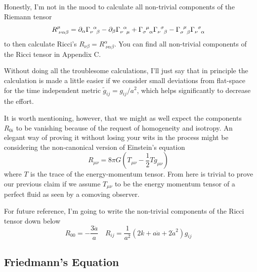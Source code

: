 Honestly, I'm not in the mood to calculate all non-trivial components of the Riemann tensor
\begin{equation}
    R^{\mu}_{\;\nu\alpha\beta} = \partial_{\alpha}\Gamma_{\nu\;\;\beta}^{\;\;\alpha} - \partial_{\beta}\Gamma_{\nu\;\;\mu}^{\;\;\alpha} + \Gamma_{\sigma\;\;\alpha}^{\;\;\mu}\Gamma_{\nu\;\;\beta}^{\;\;\sigma} - \Gamma_{\sigma\;\;\beta}^{\;\;\mu}\Gamma_{\nu\;\;\alpha}^{\;\;\sigma}
    \label{eq:riemann tensor}
\end{equation}
to then calculate Ricci's $R_{\nu\beta} =  R^{\alpha}_{\;\nu\alpha\beta}$. You can find all non-trivial components of the Ricci tensor in Appendix C.
\par Without doing all the troublesome calculations, I'll just say that in principle the calculation is made a little easier if we consider small deviations from flat-space for the time independent metric $\tilde{g}_{ij} = g_{ij}/a^{2}$, which helps significantly to decrease the effort.
\par It is worth mentioning, however, that we might as well expect the components $R_{0i}$ to be vanishing because of the request of homogeneity and isotropy. An elegant way of proving it without losing your wits in the process might be considering the non-canonical version of Einstein's equation
\begin{equation}
    R_{\mu\nu} = 8\pi G \left(T_{\mu\nu} -\frac{1}{2}Tg_{\mu\nu}\right)
    \label{eq:einstein_inverted}
\end{equation}
where $T$ is the trace of the energy-momentum tensor. From here is trivial to prove our previous claim if we assume $T_{\mu\nu}$ to be the energy momentum tensor of a perfect fluid as seen by a comoving observer.
\par For future reference, I'm going to write the non-trivial components of the Ricci tensor down below
\begin{equation}
    R_{00} = -\frac{3\ddot{a}}{a} \quad R_{ij} = \frac{1}{a^{2}}(2k + a\ddot{a}+2\dot{a}^{2})g_{ij}
\end{equation}

\subsection{Friedmann's Equation}

